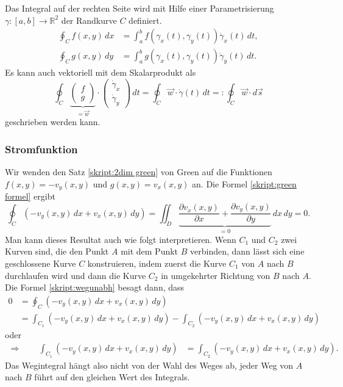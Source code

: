Das Integral auf der rechten Seite wird mit Hilfe einer Parametrisierung
$\gamma\colon [a,b]\to\mathbb R^2$ der Randkurve $C$ definiert.
\begin{align*}
\oint_C f(x,y)\,dx
&=
\int_a^b f(\gamma_x(t),\gamma_y(t))\dot{\gamma}_x(t)\,dt,
\\
\oint_C g(x,y)\,dy
&=
\int_a^b g(\gamma_x(t),\gamma_y(t))\dot{\gamma}_y(t)\,dt.
\end{align*}
Es kann auch vektoriell mit dem Skalarprodukt als
\[
\oint_C
\underbrace{
\begin{pmatrix}f\\g\end{pmatrix}
}_{\displaystyle =\vec{w}}
\cdot
\begin{pmatrix}\dot\gamma_x\\\dot\gamma_y\end{pmatrix}
\,dt
=
\oint_C \vec{w}\cdot\dot\gamma(t)\,dt
=:
\oint_C \vec{w}\cdot d\vec{s}
\]
geschrieben werden kann.

\subsubsection{Stromfunktion}
Wir wenden den Satz \ref{skript:2dim green} von Green auf die
Funktionen $f(x,y)=-v_y(x,y)$ und $g(x,y)=v_x(x,y)$ an.
Die Formel \eqref{skript:green formel} ergibt
\begin{equation}
\oint_C (-v_y(x,y)\,dx + v_x(x,y)\,dy)
=
\iint_D
\underbrace{
\frac{\partial v_x(x,y)}{\partial x}
+
\frac{\partial v_y(x,y)}{\partial y}
}_{\displaystyle=0}
\,dx\,dy
=
0.
\label{skript:wegunabh}
\end{equation}
Man kann dieses Resultat auch wie folgt interpretieren.
Wenn $C_1$ und $C_2$ zwei Kurven sind, die den Punkt $A$ mit dem Punkt $B$
verbinden, dann lässt sich eine geschlossene Kurve $C$ konstruieren, indem
zuerst die Kurve $C_1$ von $A$ nach $B$ durchlaufen wird und dann die
Kurve $C_2$ in umgekehrter Richtung von $B$ nach $A$.
Die Formel \eqref{skript:wegunabh} besagt dann, dass 
\begin{align*}
0
&=
\oint_{C} (-v_y(x,y)\,dx + v_x(x,y)\,dy)
\\
&=
\int_{C_1} (-v_y(x,y)\,dx + v_x(x,y)\,dy)
-
\int_{C_2} (-v_y(x,y)\,dx + v_x(x,y)\,dy)
\end{align*}
oder
\begin{align*}
\Rightarrow
\qquad
\int_{C_1} (-v_y(x,y)\,dx + v_x(x,y)\,dy)
&=
\int_{C_2} (-v_y(x,y)\,dx + v_x(x,y)\,dy).
\end{align*}
Das Wegintegral hängt also nicht von der Wahl des Weges ab, jeder Weg
von $A$ nach $B$ führt auf den gleichen Wert des Integrals.

